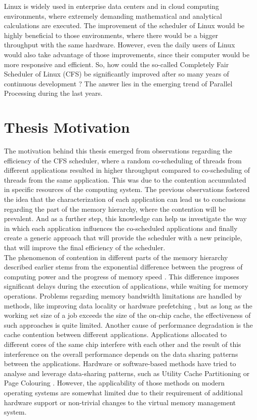 \documentclass[diploma]{Styles/softlab-thesis}
\begin{document}
Linux is widely used in enterprise data centers and in cloud computing environments, where extremely demanding mathematical and analytical calculations are executed. The improvement of the scheduler of Linux would be highly beneficial to those environments, where there would be a bigger throughput with the same hardware. However, even the daily users of Linux would also take advantage of those improvements, since their computer would be more responsive and efficient. So, how could the so-called Completely Fair Scheduler of Linux (CFS) \cite{reference17} be significantly improved after so many years of continuous development ? The answer lies in the emerging trend of Parallel Processing during the last years. 


\section{Thesis Motivation}

The motivation behind this thesis emerged from observations regarding the efficiency of the CFS scheduler, where a random co-scheduling of threads from different applications resulted in higher throughput compared to co-scheduling of threads from the same application. This was due to the contention accumulated in specific resources of the computing system. The previous observations fostered the idea that the characterization of each application can lead us to conclusions regarding the part of the memory hierarchy, where the contention will be prevalent. And as a further step, this knowledge can help us investigate the way in which each application influences the co-scheduled applications and finally create a generic approach that will provide the scheduler with a new principle, that will improve the final efficiency of the scheduler. \\

The phenomenon of contention in different parts of the memory hierarchy described earlier stems from the exponential difference between the progress of computing power and the progress of memory speed \cite{reference5}. This difference imposes significant delays during the execution of applications, while waiting for memory operations. Problems regarding memory bandwidth limitations are handled by methods, like improving data locality or hardware prefetching \cite{reference6}, but as long as the working set size of a job exceeds the size of the on-chip cache, the effectiveness of such approaches is quite limited. Another cause of performance degradation is the cache contention between different applications. Applications allocated to different cores of the same chip interfere with each other and the result of this interference on the overall performance depends on the data sharing patterns between the applications. Hardware or software-based methods have tried to analyse and leverage data-sharing patterns, such as Utility Cache Partitioning \cite{reference4} or Page Colouring \cite{reference3}. However, the applicability of those methods on modern operating systems are somewhat limited due to their requirement of additional hardware support or non-trivial changes to the virtual memory management system. \\
\end{document}
